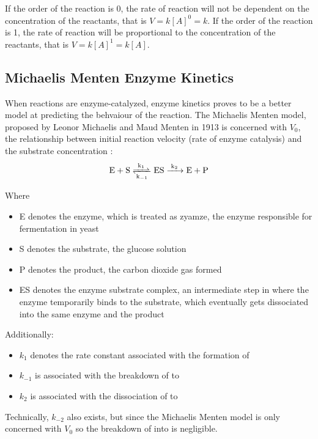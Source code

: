 \documentclass{article}
\begin{document}
\medskip

If the order of the reaction is 0, the rate of reaction will not be dependent on the concentration of the reactants, that is $V = k[A]^0 = k$. If the order of the reaction is 1, the rate of reaction will be proportional to the concentration of the reactants, that is $V = k[A]^1 = k[A]$.

\subsection{Michaelis Menten Enzyme Kinetics}
When reactions are enzyme-catalyzed, enzyme kinetics proves to be a better model at predicting the behvaiour of the reaction. The Michaelis Menten model, proposed by Leonor Michaelis and Maud Menten in 1913 is concerned with $V_0$, the relationship between initial reaction velocity (rate of enzyme catalysis) and the substrate concentration \parencite{ref}:
\begin{equation}
    \ce{E + S <=>[k_1][k_{-1}] ES ->[k_2] E + P}
\end{equation}

Where
\begin{itemize}[topsep=\parskip, noitemsep]
    \item E denotes the enzyme, which is treated as zyamze, the enzyme responsible for fermentation in yeast
    \item S denotes the substrate, the glucose solution
    \item P denotes the product, the carbon dioxide gas formed
    \item ES denotes the enzyme substrate complex, an intermediate step in where the enzyme temporarily binds to the substrate, which eventually gets dissociated into the same enzyme and the product
\end{itemize}

\medskip

Additionally:
\begin{itemize}[topsep=\parskip, noitemsep]
    \item $k_1$ denotes the rate constant associated with the formation of 
    \item $k_{-1}$ is associated with the breakdown of  to 
    \item $k_2$ is associated with the dissociation of  to 
\end{itemize}

\medskip

Technically, $k_{-2}$ also exists, but since the Michaelis Menten model is only concerned with $V_0$ so the breakdown of  into  is negligible.
\end{document}
